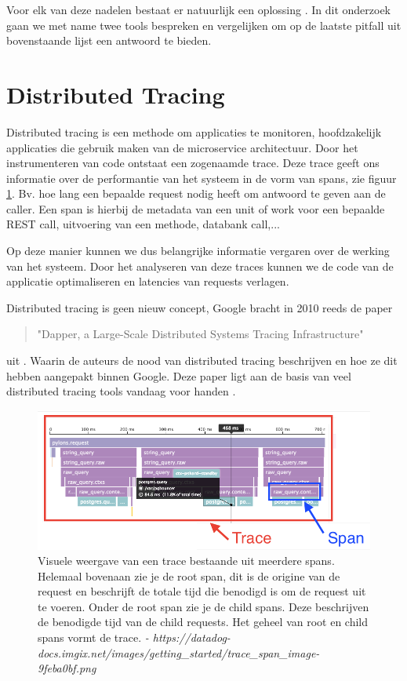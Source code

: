 Voor elk van deze nadelen bestaat er natuurlijk een oplossing \autocite{Hummel2018}. In dit onderzoek gaan we met name twee tools bespreken en vergelijken om op de laatste pitfall uit bovenstaande lijst een antwoord te bieden.

\section{Distributed Tracing}
Distributed tracing is een methode om applicaties te monitoren, hoofdzakelijk applicaties die gebruik maken van de microservice architectuur. Door het instrumenteren van code ontstaat een zogenaamde trace. Deze trace geeft ons informatie over de performantie van het systeem in de vorm van spans, zie figuur \ref{fig:trace}. Bv. hoe lang een bepaalde request nodig heeft om antwoord te geven aan de caller. Een span is hierbij de metadata van een unit of work voor een bepaalde \gls{REST} call, uitvoering van een methode, databank call,...

Op deze manier kunnen we dus belangrijke informatie vergaren over de werking van het systeem. Door het analyseren van deze traces kunnen we de code van de applicatie optimaliseren en \gls{latencies} van requests verlagen.

Distributed tracing is geen nieuw concept, Google bracht in 2010 reeds de paper \begin{quotation}
	"Dapper, a Large-Scale Distributed Systems Tracing Infrastructure"
\end{quotation} uit \autocite{36356}. Waarin de auteurs de nood van distributed tracing beschrijven en hoe ze dit hebben aangepakt binnen Google. Deze paper ligt aan de basis van veel distributed tracing tools vandaag voor handen \autocite{Mace2017}.

\begin{figure}
	\includegraphics[width=\linewidth]{img/trace_span.png}
	\caption{Visuele weergave van een trace bestaande uit meerdere spans. Helemaal bovenaan zie je de root span, dit is de origine van de request en beschrijft de totale tijd die benodigd is om de request uit te voeren.  Onder de root span zie je de child spans. Deze beschrijven de benodigde tijd van de child requests. Het geheel van root en child spans vormt de trace. \textit{- https://datadog-docs.imgix.net/images/getting\_started/trace\_span\_image-9feba0bf.png}}
	\label{fig:trace}
\end{figure}

